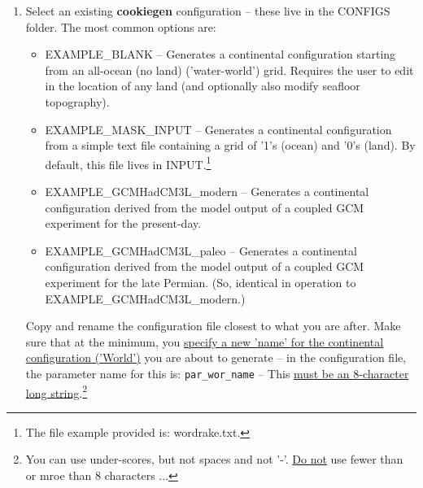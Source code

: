 \begin{enumerate}

\vspace{2mm}
\item Select an existing \textbf{cookiegen} configuration -- these live in the \textsf{\footnotesize CONFIGS} folder. The most common options are:

\begin{itemize}[noitemsep]

\vspace{1mm}
\item \textsf{\footnotesize EXAMPLE\_BLANK} -- Generates a continental configuration starting from an all-ocean (no land) ('water-world') grid. Requires the user to edit in the location of any land (and optionally also modify seafloor topography).

\vspace{1mm}
\item \textsf{\footnotesize EXAMPLE\_MASK\_INPUT} -- Generates a continental configuration from a simple text file containing a grid of '1's (ocean) and '0's (land). By default, this file lives in \textsf{\footnotesize INPUT}.\footnote{The file example provided is: \textsf{\footnotesize wordrake.txt}.} 

\vspace{1mm}
\item \textsf{\footnotesize EXAMPLE\_GCMHadCM3L\_modern} -- Generates a continental configuration derived from the model output of a coupled GCM experiment for the present-day. 

\vspace{1mm}
\item \textsf{\footnotesize EXAMPLE\_GCMHadCM3L\_paleo} -- Generates a continental configuration derived from the model output of a coupled GCM experiment for the late Permian. (So, identical in operation to \textsf{\footnotesize EXAMPLE\_GCMHadCM3L\_modern}.)

\end{itemize}

\vspace{1mm}
Copy and rename the configuration file closest to what you are after. Make sure that at the minimum, you \uline{specify a new 'name' for the continental configuration ('World')} you are about to generate -- in the configuration file, the parameter name for this is: \texttt{\small par\_wor\_name} -- This \uline{must be an 8-character long string}.\footnote{You can use under-scores, but not spaces and not '-'. \uline{Do not} use fewer than or mroe than 8 characters ...}


\end{enumerate}
